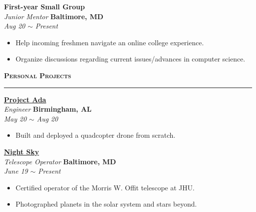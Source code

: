 \documentclass[10pt, letterpaper]{article}
\begin{document}
\begin{paracol}{2}
	\textbf{First-year Small Group}\\
	\textit{Junior Mentor}
	\switchcolumn
	\raggedleft\textbf{Baltimore, MD}\\
	\raggedleft\textit{Aug 20 $\sim$ Present}
\end{paracol}\vspace{-1mm}
\vspace{-2mm}
\begin{itemize}
	\item Help incoming freshmen navigate an online college experience.
	\vspace{-3mm}
	\item Organize discussions regarding current issues/advances in computer science.
\end{itemize}

{\large \textbf{\textsc{Personal Projects}}}
\vspace{5pt}
\hrule

\begin{paracol}{2}
	\textbf{\href{https://ugrad.cs.jhu.edu/~czhu26/new_sub/projects/drone.html}{Project Ada}}\\
	\textit{Engineer}
	\switchcolumn
	\raggedleft\textbf{Birmingham, AL}\\
	\raggedleft\textit{May 20 $\sim$ Aug 20}
\end{paracol}\vspace{-1mm}
\vspace{-2mm}
\begin{itemize}
	\item Built and deployed a quadcopter drone from scratch.
\end{itemize}
\vspace{-2mm}

\begin{paracol}{2}
	\textbf{\href{https://ugrad.cs.jhu.edu/~czhu26/new_sub/projects/observatory.html}{Night Sky}}\\
	\textit{Telescope Operator}
	\switchcolumn
	\raggedleft\textbf{Baltimore, MD}\\
	\raggedleft\textit{June 19 $\sim$ Present}
\end{paracol}\vspace{-1mm}
\vspace{-2mm}
\begin{itemize}
	\item Certified operator of the Morris W. Offit telescope at JHU.
	\vspace{-3mm}
	\item Photographed planets in the solar system and stars beyond.
\end{itemize}
\end{document}
